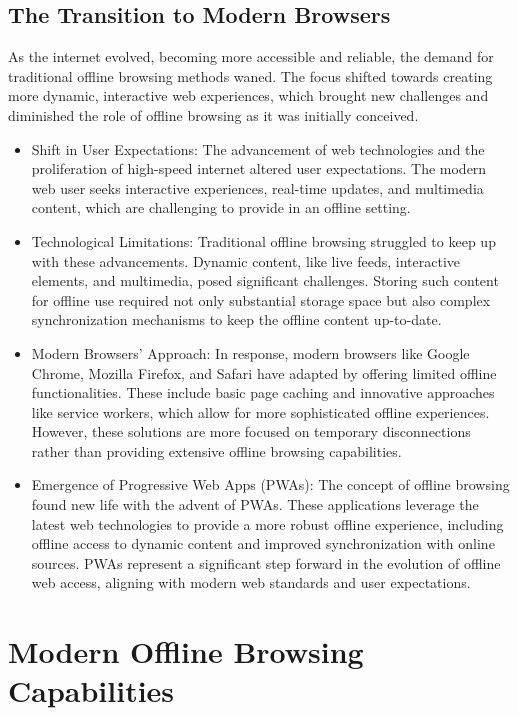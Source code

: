 \documentclass[12pt]{article}
\begin{document}
\subsection{The Transition to Modern Browsers}

As the internet evolved, becoming more accessible and reliable, the demand for traditional offline browsing methods waned. The focus shifted towards creating more dynamic, interactive web experiences, which brought new challenges and diminished the role of offline browsing as it was initially conceived.

\begin{itemize}[]
    \item Shift in User Expectations: The advancement of web technologies and the proliferation of high-speed internet altered user expectations. The modern web user seeks interactive experiences, real-time updates, and multimedia content, which are challenging to provide in an offline setting.
    \item Technological Limitations: Traditional offline browsing struggled to keep up with these advancements. Dynamic content, like live feeds, interactive elements, and multimedia, posed significant challenges. Storing such content for offline use required not only substantial storage space but also complex synchronization mechanisms to keep the offline content up-to-date.
    \item Modern Browsers’ Approach: In response, modern browsers like Google Chrome, Mozilla Firefox, and Safari have adapted by offering limited offline functionalities. These include basic page caching and innovative approaches like service workers, which allow for more sophisticated offline experiences. However, these solutions are more focused on temporary disconnections rather than providing extensive offline browsing capabilities.
    \item Emergence of Progressive Web Apps (PWAs): The concept of offline browsing found new life with the advent of PWAs. These applications leverage the latest web technologies to provide a more robust offline experience, including offline access to dynamic content and improved synchronization with online sources. PWAs represent a significant step forward in the evolution of offline web access, aligning with modern web standards and user expectations.
\end{itemize}
\citep*{Network}
\section{Modern Offline Browsing Capabilities}
\end{document}
